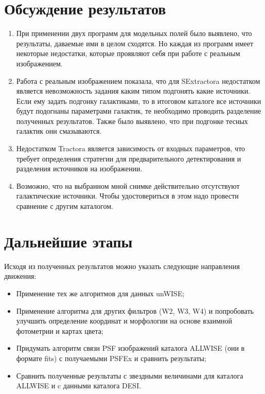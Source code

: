\documentclass[12pt,a4paper]{article}
\begin{document}
\section{Обсуждение результатов}

\begin{enumerate}
    \item При применении двух программ для модельных полей было выявлено, что результаты, даваемые ими в целом сходятся. Но каждая из программ имеет некоторые недостатки, которые проявляют себя при работе с реальным изображением.
    \item Работа с реальным изображением показала, что для SExtractora недостатком является невозможность задания каким типом подгонять какие источники. Если ему задать подгонку галактиками, то в итоговом каталоге все источники будут подогнаны параметрами галактик, те необходимо проводить разделение полученных результатов. Также было выявлено, что при подгонке тесных галактик они смазываются. 
    \item Недостатком Tractora является зависимость от входных параметров, что требует определения стратегии для предварительного детектирования и разделения источников на изображении. 
    \item Возможно, что на выбранном мной снимке действительно отсутствуют галактические источники. Чтобы удостовериться в этом надо провести сравнение с другим каталогом.
\end{enumerate}

\section{Дальнейшие этапы}
     Исходя из полученных результатов можно указать следующие направления движения:
          \begin{itemize}
                \item Применение тех же алгоритмов для данных unWISE;
                \item Применение алгоритма для других фильтров (W2, W3, W4) и попробовать улучшить определение координат и морфологии на основе взаимной фотометрии и картах цвета;
                \item Придумать алгоритм связи PSF изображений каталога ALLWISE (они в формате fits) с получаемыми PSFEx и сравнить результаты; 
                \item Сравнить полученные результаты с звездными величинами для каталога ALLWISE и c данными каталога DESI.
           \end{itemize}  
  
\end{document}
